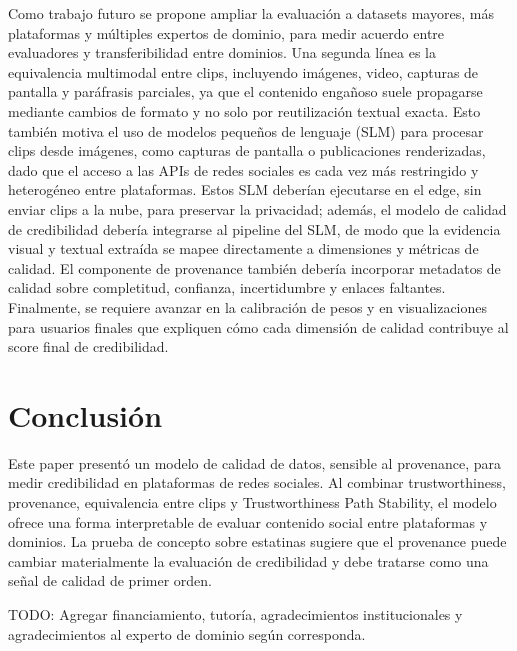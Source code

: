 \documentclass[sigconf, nonacm]{acmart}
\begin{document}
Como trabajo futuro se propone ampliar la evaluaci\'on a datasets mayores, m\'as
plataformas y m\'ultiples expertos de dominio, para medir acuerdo entre evaluadores
y transferibilidad entre dominios. Una segunda l\'inea es la equivalencia multimodal
entre clips, incluyendo im\'agenes, video, capturas de pantalla y par\'afrasis
parciales, ya que el contenido enga\~noso suele propagarse mediante cambios de
formato y no solo por reutilizaci\'on textual exacta. Esto tambi\'en motiva el uso
de modelos peque\~nos de lenguaje (SLM) para procesar clips desde im\'agenes, como
capturas de pantalla o publicaciones renderizadas, dado que el acceso a las APIs
de redes sociales es cada vez m\'as restringido y heterog\'eneo entre plataformas.
Estos SLM deber\'ian ejecutarse en el edge, sin enviar clips a la nube, para
preservar la privacidad; adem\'as, el modelo de calidad de credibilidad deber\'ia
integrarse al pipeline del SLM, de modo que la evidencia visual y textual extra\'ida
se mapee directamente a dimensiones y m\'etricas de calidad.
El componente de provenance tambi\'en deber\'ia incorporar metadatos de calidad sobre completitud, confianza,
incertidumbre y enlaces faltantes. Finalmente, se requiere avanzar en la
calibraci\'on de pesos y en visualizaciones para usuarios finales que expliquen c\'omo
cada dimensi\'on de calidad contribuye al score final de credibilidad.

\section{Conclusi\'on}

Este paper present\'o un modelo de calidad de datos, sensible al provenance, para
medir credibilidad en plataformas de redes sociales. Al combinar trustworthiness,
provenance, equivalencia entre clips y Trustworthiness Path Stability, el modelo
ofrece una forma interpretable de evaluar contenido social entre plataformas y
dominios. La prueba de concepto sobre estatinas sugiere que el provenance puede
cambiar materialmente la evaluaci\'on de credibilidad y debe tratarse como una
se\~nal de calidad de primer orden.

\begin{acks}
TODO: Agregar financiamiento, tutor\'ia, agradecimientos institucionales y
agradecimientos al experto de dominio seg\'un corresponda.
\end{acks}



\end{document}
